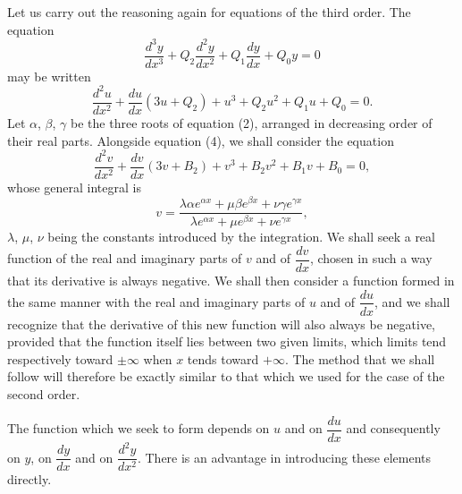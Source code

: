 \documentclass[11pt]{article}
\begin{document}
Let us carry out the reasoning again for equations of the third order. The equation
\[
\frac{d^3y}{dx^3}+Q_2\frac{d^2y}{dx^2}+Q_1\frac{dy}{dx}+Q_0y=0
\]
may be written
\[
\tag{4}
\frac{d^2u}{dx^2}+\frac{du}{dx}(3u+Q_2)+u^3+Q_2u^2+Q_1u+Q_0=0.
\]
Let $\alpha$, $\beta$, $\gamma$ be the three roots of equation (2), arranged in decreasing order of their real parts. Alongside equation (4), we shall consider the equation
\[
\tag{4\,bis}
\frac{d^2v}{dx^2}+\frac{dv}{dx}(3v+B_2)+v^3+B_2v^2+B_1v+B_0=0,
\]
whose general integral is
\[
v=\frac{\lambda\alpha e^{\alpha x}+\mu\beta e^{\beta x}+\nu\gamma e^{\gamma x}}{\lambda e^{\alpha x}+\mu e^{\beta x}+\nu e^{\gamma x}},
\]
$\lambda$, $\mu$, $\nu$ being the constants introduced by the integration. We shall seek a real function of the real and imaginary parts of $v$ and of $\dfrac{dv}{dx}$, chosen in such a way that its derivative is always negative. We shall then consider a function formed in the same manner with the real and imaginary parts of $u$ and of $\dfrac{du}{dx}$, and we shall recognize that the derivative of this new function will also always be negative, provided that the function itself lies between two given limits, which limits tend respectively toward $\pm\infty$ when $x$ tends toward $+\infty$. The method that we shall follow will therefore be exactly similar to that which we used for the case of the second order.

The function which we seek to form depends on $u$ and on $\dfrac{du}{dx}$ and consequently on $y$, on $\dfrac{dy}{dx}$ and on $\dfrac{d^2y}{dx^2}$. There is an advantage in introducing these elements directly.
\end{document}
